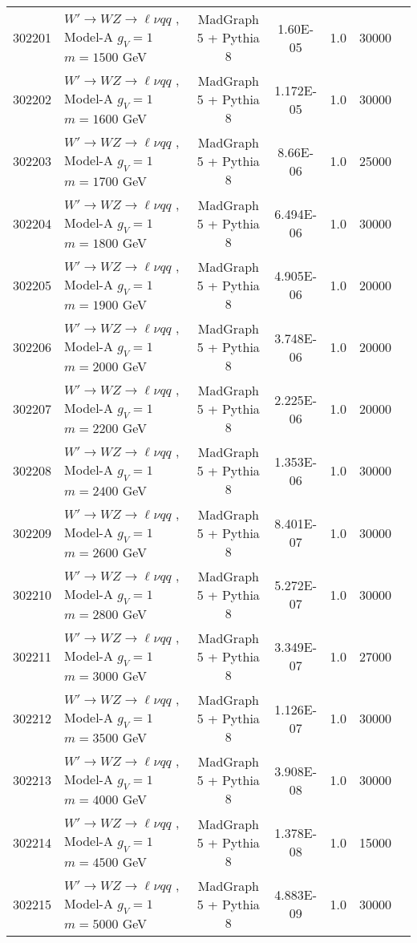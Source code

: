 \begin{landscape}
\begin{table}[!htb]
\begin{footnotesize}
\begin{center}
\begin{tabular}{c|l|c|c|c|cr}
	302201 & $W' \to WZ \to \ell\nu qq $ , Model-A $g_V=1$ $m=1500$ GeV& MadGraph 5 + Pythia 8 & 1.60E-05  & 1.0& 30000 \\ 
	302202 & $W' \to WZ \to \ell\nu qq $ , Model-A $g_V=1$ $m=1600$ GeV& MadGraph 5 + Pythia 8 & 1.172E-05 & 1.0& 30000 \\ 
	302203 & $W' \to WZ \to \ell\nu qq $ , Model-A $g_V=1$ $m=1700$ GeV& MadGraph 5 + Pythia 8 & 8.66E-06  & 1.0& 25000 \\ 
	302204 & $W' \to WZ \to \ell\nu qq $ , Model-A $g_V=1$ $m=1800$ GeV& MadGraph 5 + Pythia 8 & 6.494E-06 & 1.0& 30000 \\ 
	302205 & $W' \to WZ \to \ell\nu qq $ , Model-A $g_V=1$ $m=1900$ GeV& MadGraph 5 + Pythia 8 & 4.905E-06 & 1.0& 20000 \\ 
	302206 & $W' \to WZ \to \ell\nu qq $ , Model-A $g_V=1$ $m=2000$ GeV& MadGraph 5 + Pythia 8 & 3.748E-06 & 1.0& 20000 \\
	302207 & $W' \to WZ \to \ell\nu qq $ , Model-A $g_V=1$ $m=2200$ GeV& MadGraph 5 + Pythia 8 & 2.225E-06 & 1.0& 20000 \\
	302208 & $W' \to WZ \to \ell\nu qq $ , Model-A $g_V=1$ $m=2400$ GeV& MadGraph 5 + Pythia 8 & 1.353E-06 & 1.0& 30000 \\
	302209 & $W' \to WZ \to \ell\nu qq $ , Model-A $g_V=1$ $m=2600$ GeV& MadGraph 5 + Pythia 8 & 8.401E-07 & 1.0& 30000 \\
	302210 & $W' \to WZ \to \ell\nu qq $ , Model-A $g_V=1$ $m=2800$ GeV& MadGraph 5 + Pythia 8 & 5.272E-07 & 1.0& 30000 \\
	302211 & $W' \to WZ \to \ell\nu qq $ , Model-A $g_V=1$ $m=3000$ GeV& MadGraph 5 + Pythia 8 & 3.349E-07 & 1.0& 27000 \\
	302212 & $W' \to WZ \to \ell\nu qq $ , Model-A $g_V=1$ $m=3500$ GeV& MadGraph 5 + Pythia 8 & 1.126E-07 & 1.0& 30000 \\
	302213 & $W' \to WZ \to \ell\nu qq $ , Model-A $g_V=1$ $m=4000$ GeV& MadGraph 5 + Pythia 8 & 3.908E-08 & 1.0& 30000 \\
	302214 & $W' \to WZ \to \ell\nu qq $ , Model-A $g_V=1$ $m=4500$ GeV& MadGraph 5 + Pythia 8 & 1.378E-08 & 1.0& 15000 \\
	302215 & $W' \to WZ \to \ell\nu qq $ , Model-A $g_V=1$ $m=5000$ GeV& MadGraph 5 + Pythia 8 & 4.883E-09 & 1.0 & 30000 \\
\hline\hline
\end{tabular}
\end{center}
\end{footnotesize}
\end{table}


\end{landscape}
